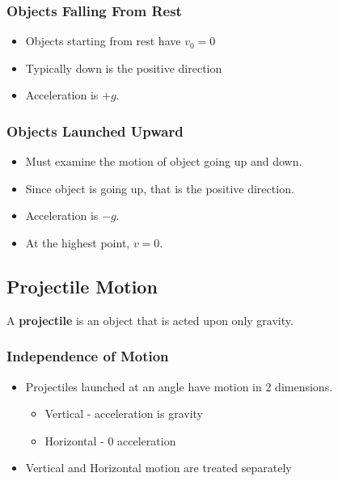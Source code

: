 \documentclass[12pt]{article}
\theoremstyle{break}
\numberwithin{theorem}{subsection}
\numberwithin{lemma}{subsection}
\numberwithin{corollary}{subsection}
\numberwithin{equation}{subsection}
\begin{document}
\subsubsection{Objects Falling From Rest}
\begin{itemize}
	\item Objects starting from rest have $v_0 = 0$
	\item Typically down is the positive direction
	\item Acceleration is $+g$.
\end{itemize}

\subsubsection{Objects Launched Upward}
\begin{itemize}
	\item Must examine the motion of object going up and down.
	\item Since object is going up, that is the positive direction.
	\item Acceleration is $-g$.
	\item At the highest point, $v = 0$.
\end{itemize}

\newpage
\subsection{Projectile Motion}
A \textbf{projectile} is an object that is acted upon only gravity.

\subsubsection{Independence of Motion}
\begin{itemize}
	\item Projectiles launched at an angle have motion in 2 dimensions.
	\begin{itemize}
		\item Vertical - acceleration is gravity
		\item Horizontal - 0 acceleration
	\end{itemize}
	\item Vertical and Horizontal motion are treated separately
\end{itemize}

\begin{center}
\end{center}
\end{document}
